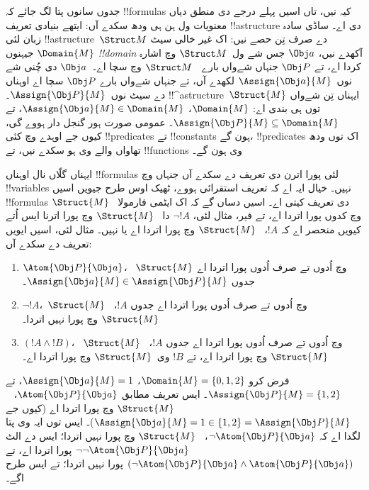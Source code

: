 \documentclass[../../../include/open-logic-section]{subfiles}
\begin{document}


جدوں سانوں پتا لگ جائے کہ !!{formula}s کیہ نیں،
تاں اسیں پہلے درجے دی منطق دیاں معنویات ول ہن
ہی ودھ سکدے آں: ایتھے بنیادی تعریف
!!a{structure} دی اے۔ ساڈی سادہ زبان لئی
!!a{structure}~$\Struct M$ دے صرف تِن حصے
نیں: اک غیر خالی سیٹ $\Domain{M}$ جیہنوں
\emph{!!{domain}} آکھدے نیں، $\Obj a$
جس شے ول~$\Struct M$ وچ اشارہ کردا اے،
تے $\Obj P$ جنہاں شےواں بارے
~$\Struct M$ وچ سچا اے۔~$\Obj a$ دی چُنی
شے نوں~$\Assign{\Obj a}{M}$ لکھدے آں،
تے جنہاں شےواں بارے $\Obj P$ سچا اے
اوہناں دے سیٹ نوں~$\Assign{\Obj P}{M}$۔
!!^a{structure}~$\Struct{M}$ ایہناں
تِن شےواں توں ہی بندی اے:
$\Domain{M}$، $\Assign{\Obj a}{M} \in
\Domain{M}$، تے $\Assign{\Obj P}{M} \subseteq \Domain{M}$۔
عمومی صورت ہور گنجل دار ہووے گی، کیوں جے اوہدے
وچ کئی !!{predicate}s تے !!{constant}s
ہون گے،
!!{predicate}s اک توں ودھ تھاواں والے وی
ہو سکدے نیں، تے !!{function}s وی ہون گے۔

ایہناں گلّاں نال اوہناں !!{formula}s لئی
پورا اترن دی تعریف دے سکدے آں جنہاں وچ
!!{variable}s نہیں۔ خیال ایہ اے کہ
تعریف استقرائی ہووے، ٹھیک اوس طرح جیویں
اسیں !!{formula}s دی تعریف کیتی اے۔
اسیں دساں گے کہ اک ایٹمی فارمولا
~$\Struct{M}$ وچ کدوں پورا اتردا اے،
تے فیر، مثال لئی، $\lnot !A$ دا
~$\Struct{M}$ وچ پورا اترنا ایس اُتے
کیویں منحصر اے کہ $!A$،
~$\Struct{M}$ وچ پورا
اتردا اے یا نہیں۔ مثال لئی، اسیں
ایویں تعریف دے سکدے آں:
\begin{enumerate}
  \item $\Atom{\Obj P}{\Obj a}$،
  ~$\Struct{M}$ وچ اُدوں تے صرف اُدوں
  پورا اتردا اے جدوں
  $\Assign{\Obj a}{M} \in \Assign{\Obj P}{M}$۔
  \item $\lnot !A$،~$\Struct{M}$ وچ
  اُدوں تے صرف اُدوں پورا اتردا اے
  جدوں $!A$،~$\Struct{M}$ وچ پورا
  نہیں اتردا۔
  \item $(!A \land !B)$،
  ~$\Struct{M}$ وچ اُدوں تے صرف
  اُدوں پورا اتردا اے جدوں
  $!A$،~$\Struct{M}$ وچ پورا
  اتردا اے، تے $!B$ وی~$\Struct{M}$
  وچ پورا اتردا اے۔
\end{enumerate}
فرض کرو $\Domain{M} = \{0, 1, 2\}$،
$\Assign{\Obj a}{M} = 1$،
تے $\Assign{\Obj P}{M} = \{1, 2\}$۔
ایس تعریف مطابق
$\Atom{\Obj P}{\Obj a}$،
~$\Struct{M}$ وچ پورا اتردا اے
(کیوں جے $\Assign{\Obj a}{M} =  1 \in \{1,2\} = \Assign{\Obj P}{M}$)۔
ایس توں ایہ وی پتا لگدا اے کہ
$\lnot \Atom{\Obj P}{\Obj a}$،
~$\Struct{M}$ وچ پورا نہیں اتردا؛
ایس دے الٹ
$\lnot\lnot \Atom{\Obj P}{\Obj
a}$ پورا اتردا اے، تے
$(\lnot \Atom{\Obj P}{\Obj a} \land \Atom{\Obj P}{\Obj a})$
پورا نہیں اتردا؛ تے ایس طرح اگے۔
\end{document}
